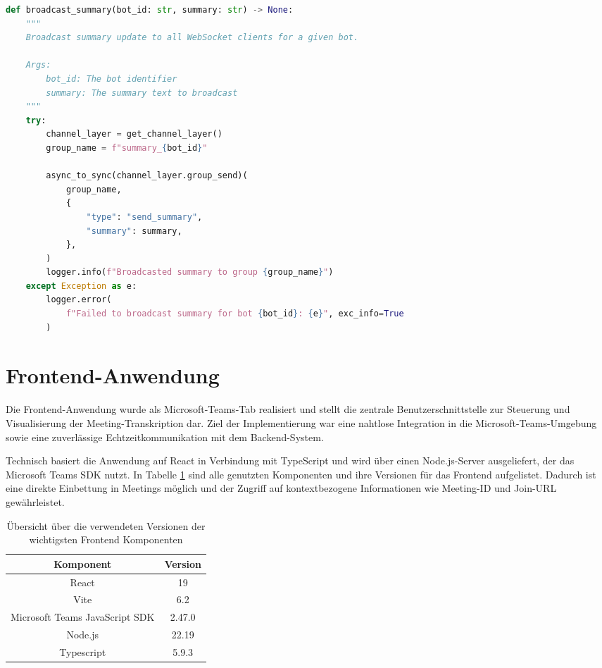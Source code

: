 \begin{lstlisting}[language=python, style=pythonstyle, caption=Erhalten wichtiger Informationen aus dem Frontend, label=lst:startbot]
def broadcast_summary(bot_id: str, summary: str) -> None:
    """
    Broadcast summary update to all WebSocket clients for a given bot.

    Args:
        bot_id: The bot identifier
        summary: The summary text to broadcast
    """
    try:
        channel_layer = get_channel_layer()
        group_name = f"summary_{bot_id}"

        async_to_sync(channel_layer.group_send)(
            group_name,
            {
                "type": "send_summary",
                "summary": summary,
            },
        )
        logger.info(f"Broadcasted summary to group {group_name}")
    except Exception as e:
        logger.error(
            f"Failed to broadcast summary for bot {bot_id}: {e}", exc_info=True
        )
\end{lstlisting}

\section{Frontend-Anwendung}

Die Frontend-Anwendung wurde als Microsoft-Teams-Tab realisiert und stellt die zentrale Benutzerschnittstelle zur Steuerung und Visualisierung der Meeting-Transkription dar. Ziel der Implementierung war eine nahtlose Integration in die Microsoft-Teams-Umgebung sowie eine zuverlässige Echtzeitkommunikation mit dem Backend-System. 

Technisch basiert die Anwendung auf React \cite{react} in Verbindung mit TypeScript \cite{typescr} und wird über einen Node.js\cite{node}-Server ausgeliefert, der das Microsoft Teams SDK nutzt. In Tabelle \ref{tab:frontend_versions} sind alle genutzten Komponenten und ihre Versionen für das Frontend aufgelistet. Dadurch ist eine direkte Einbettung in Meetings möglich und der Zugriff auf kontextbezogene Informationen wie Meeting-ID und Join-URL gewährleistet.

\begin{table}[H]
    \centering
    \begin{tabular}{|c|c|}
        \hline
         \textbf{Komponent}&  \textbf{Version}\\
         \hline
         React & 19\\
         \hline
         Vite \cite{vite} & 6.2\\
         \hline
         Microsoft Teams JavaScript SDK \cite{agentsdk} & 2.47.0\\
         \hline
         Node.js & 22.19\\
         \hline
         Typescript & 5.9.3\\
         \hline
    \end{tabular}
    \caption{Übersicht über die verwendeten Versionen der wichtigsten Frontend Komponenten}
    \label{tab:frontend_versions}
\end{table}

